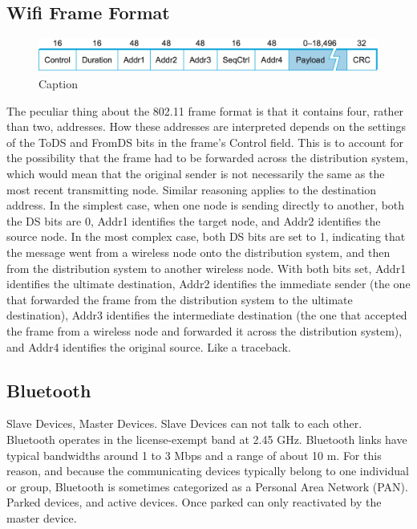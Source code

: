 \documentclass[12pt]{book}
\begin{document}
\subsection{Wifi Frame Format}
\begin{figure}[H]
    \centering
    \includegraphics[width = \textwidth]{Pictures/Wifi Frame Format.png}
    \caption{Caption}
    \label{fig:my_label}
\end{figure}
The peculiar thing about the 802.11 frame format is that it contains four, rather than two, addresses. How these addresses are interpreted depends on the settings of the ToDS and FromDS bits in the frame’s Control field. This is to account for the possibility that the frame had to be forwarded across the distribution system, which would mean that the original sender is not necessarily the same as the most recent transmitting node. Similar reasoning applies to the destination address. In the simplest case, when one node is sending directly to another, both the DS bits are 0, Addr1 identifies the target node, and Addr2 identifies the source node. In the most complex case, both DS bits are set to 1, indicating that the message went from a wireless node onto the distribution system, and then from the distribution system to another wireless node. With both bits set, Addr1 identifies the ultimate destination, Addr2 identifies the immediate sender (the one that forwarded the frame from the distribution system to the ultimate destination), Addr3 identifies the intermediate destination (the one that accepted the frame from a wireless node and forwarded it across the distribution system), and Addr4 identifies the original source. Like a traceback.

\subsection{Bluetooth}
Slave Devices, Master Devices. Slave Devices can not talk to each other. Bluetooth operates in the license-exempt band at 2.45 GHz. Bluetooth links have typical bandwidths around 1 to 3 Mbps and a range of about 10 m. For this reason, and because the communicating devices typically belong to one individual or group, Bluetooth is sometimes categorized as a Personal Area Network (PAN). Parked devices, and active devices. Once parked can only reactivated by the master device.
\end{document}
